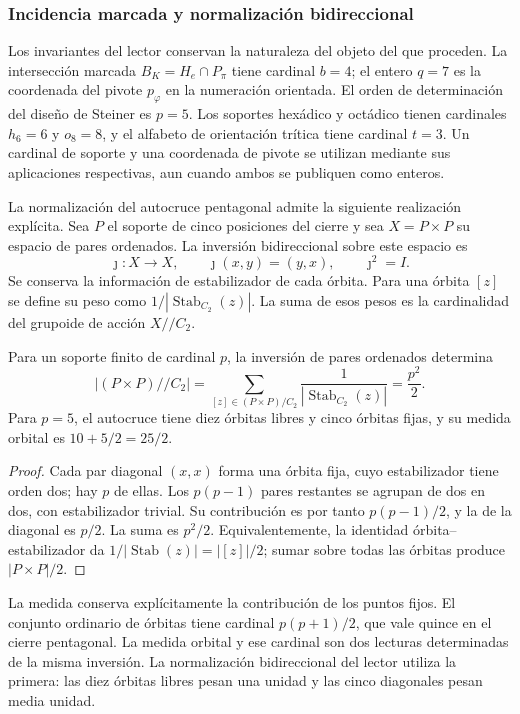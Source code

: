 \subsubsection{Incidencia marcada y normalización bidireccional}
\label{ii:sec:ii09-normalizacion-bidireccional}

Los invariantes del lector conservan la naturaleza del objeto del que
proceden. La intersección marcada $B_K=H_e\cap P_\pi$ tiene cardinal
$b=4$; el entero $q=7$ es la coordenada del pivote $p_\varphi$ en la
numeración orientada. El orden de determinación del diseño de Steiner
es $p=5$. Los soportes hexádico y octádico tienen cardinales $h_6=6$
y $o_8=8$, y el alfabeto de orientación trítica tiene cardinal $t=3$.
Un cardinal de soporte y una coordenada de pivote se utilizan mediante
sus aplicaciones respectivas, aun cuando ambos se publiquen como enteros.

La normalización del autocruce pentagonal admite la siguiente
realización explícita. Sea $P$ el soporte de cinco posiciones del cierre
y sea $X=P\times P$ su espacio de pares ordenados. La inversión
bidireccional sobre este espacio es
\[
 \jmath:X\longrightarrow X,\qquad \jmath(x,y)=(y,x),
 \qquad\jmath^2=I.
\]
Se conserva la información de estabilizador de cada órbita. Para una
órbita $[z]$ se define su peso como
$1/|\operatorname{Stab}_{C_2}(z)|$. La suma de esos pesos es la
cardinalidad del grupoide de acción $X/\!/C_2$.

\begin{proposition}
\label{ii:prop:ii09-semicuadrado-orbital}
Para un soporte finito de cardinal $p$, la inversión de pares ordenados
determina
\[
 |(P\times P)/\!/C_2|
 =\sum_{[z]\in(P\times P)/C_2}
      \frac1{|\operatorname{Stab}_{C_2}(z)|}
 =\frac{p^2}{2}.
\]
Para $p=5$, el autocruce tiene diez órbitas libres y cinco órbitas
fijas, y su medida orbital es $10+5/2=25/2$.
\end{proposition}
\begin{proof}
Cada par diagonal $(x,x)$ forma una órbita fija, cuyo estabilizador
tiene orden dos; hay $p$ de ellas. Los $p(p-1)$ pares restantes se
agrupan de dos en dos, con estabilizador trivial. Su contribución es
por tanto $p(p-1)/2$, y la de la diagonal es $p/2$. La suma es
$p^2/2$. Equivalentemente, la identidad órbita--estabilizador da
$1/|\operatorname{Stab}(z)|=|[z]|/2$; sumar sobre todas las órbitas
produce $|P\times P|/2$.
\end{proof}

La medida conserva explícitamente la contribución de los puntos fijos.
El conjunto ordinario de órbitas tiene cardinal $p(p+1)/2$, que vale
quince en el cierre pentagonal. La medida orbital y ese cardinal son
dos lecturas determinadas de la misma inversión. La normalización
bidireccional del lector utiliza la primera: las diez órbitas libres
pesan una unidad y las cinco diagonales pesan media unidad.

